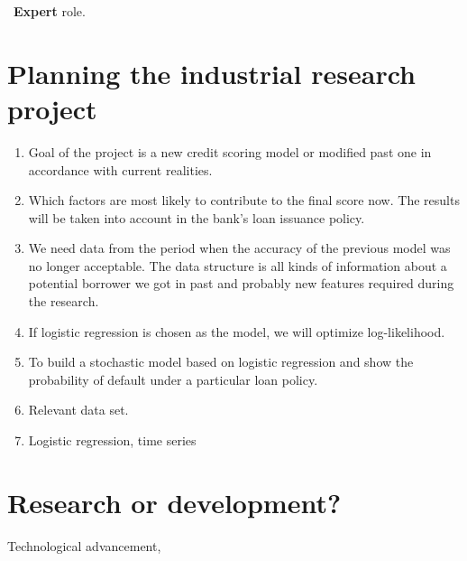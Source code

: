 \documentclass[12pt]{article}
\date{}
\begin{document}
\maketitle

~\textbf{Expert} role.


\section{Planning the industrial research project}

\begin{enumerate}
\item Goal of the project is a new credit scoring model or modified past one in accordance with current realities.
\item Which factors  are most likely to  contribute to the final score now. The results will be taken into account in the bank's loan issuance policy.
\item We need data from the period when the accuracy of the previous model was no longer acceptable. The data structure is all kinds of information about a potential borrower we got in past and probably new features required during the research.
\item If logistic regression is chosen as the model, we will optimize log-likelihood.
\item To build a stochastic model based on logistic regression and show the probability of default under a particular loan policy.
\item Relevant data set.
\item Logistic regression, time series
\end{enumerate}

\section{Research or development?}
Technological advancement,

%
%
\end{document}
